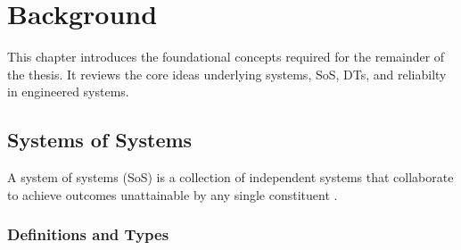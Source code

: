 \chapter{Background}\label{ch:background}
This chapter introduces the foundational concepts required for the remainder of the thesis. 
It reviews the core ideas underlying systems, SoS, DTs, and reliabilty in engineered systems. 

\section{Systems of Systems}
A system of systems (SoS) is a collection of independent systems that collaborate to achieve outcomes unattainable by any single constituent \cite{maier1998architecting}.




\subsection{Definitions and Types}\label{subsec:background-sos-definitions}

